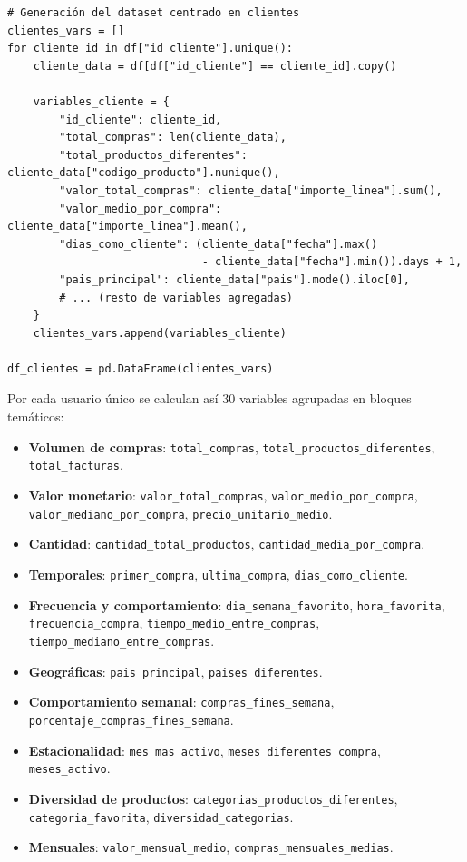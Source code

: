 \documentclass[11pt,a4paper]{article}
\begin{document}
\begin{lstlisting}
# Generación del dataset centrado en clientes
clientes_vars = []
for cliente_id in df["id_cliente"].unique():
    cliente_data = df[df["id_cliente"] == cliente_id].copy()

    variables_cliente = {
        "id_cliente": cliente_id,
        "total_compras": len(cliente_data),
        "total_productos_diferentes": cliente_data["codigo_producto"].nunique(),
        "valor_total_compras": cliente_data["importe_linea"].sum(),
        "valor_medio_por_compra": cliente_data["importe_linea"].mean(),
        "dias_como_cliente": (cliente_data["fecha"].max()
                              - cliente_data["fecha"].min()).days + 1,
        "pais_principal": cliente_data["pais"].mode().iloc[0],
        # ... (resto de variables agregadas)
    }
    clientes_vars.append(variables_cliente)

df_clientes = pd.DataFrame(clientes_vars)
\end{lstlisting}

\noindent Por cada usuario único se calculan así 30 variables agrupadas en bloques temáticos:

\begin{itemize}
    \item \textbf{Volumen de compras}: \texttt{total\_compras}, \texttt{total\_productos\_diferentes}, \texttt{total\_facturas}.
    \item \textbf{Valor monetario}: \texttt{valor\_total\_compras}, \texttt{valor\_medio\_por\_compra}, \texttt{valor\_mediano\_por\_compra}, \texttt{precio\_unitario\_medio}.
    \item \textbf{Cantidad}: \texttt{cantidad\_total\_productos}, \texttt{cantidad\_media\_por\_compra}.
    \item \textbf{Temporales}: \texttt{primer\_compra}, \texttt{ultima\_compra}, \texttt{dias\_como\_cliente}.
    \item \textbf{Frecuencia y comportamiento}: \texttt{dia\_semana\_favorito}, \texttt{hora\_favorita}, \texttt{frecuencia\_compra}, \texttt{tiempo\_medio\_entre\_compras}, \texttt{tiempo\_mediano\_entre\_compras}.
    \item \textbf{Geográficas}: \texttt{pais\_principal}, \texttt{paises\_diferentes}.
    \item \textbf{Comportamiento semanal}: \texttt{compras\_fines\_semana}, \texttt{porcentaje\_compras\_fines\_semana}.
    \item \textbf{Estacionalidad}: \texttt{mes\_mas\_activo}, \texttt{meses\_diferentes\_compra}, \texttt{meses\_activo}.
    \item \textbf{Diversidad de productos}: \texttt{categorias\_productos\_diferentes}, \texttt{categoria\_favorita}, \texttt{diversidad\_categorias}.
    \item \textbf{Mensuales}: \texttt{valor\_mensual\_medio}, \texttt{compras\_mensuales\_medias}.
\end{itemize}
\end{document}
